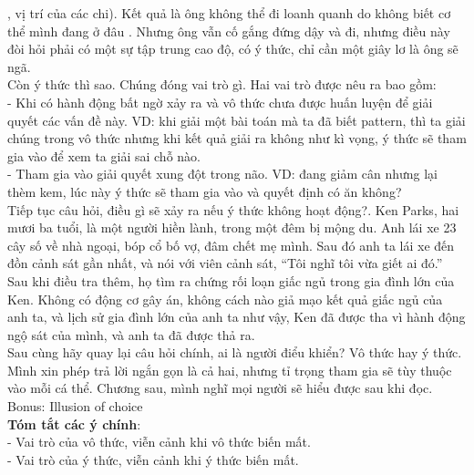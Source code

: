 \documentclass{article}
\newcommand\tab[1][1cm]{\hspace*{#1}}
\begin{document}
, vị trí của các chi). Kết quả là ông không thể đi loanh quanh do không biết cơ thể mình đang ở đâu
. Nhưng ông vẫn cố gắng đứng dậy và đi, nhưng điều này đòi hỏi phải có một sự tập trung cao độ, 
có ý thức, chỉ cần một giây lơ là ông sẽ ngã.\\
\tab Còn ý thức thì sao. Chúng đóng vai trò gì. Hai vai trò được nêu ra bao gồm:\\
\tab - Khi có hành động bất ngờ xảy ra và vô thức chưa được huấn luyện để giải quyết các vấn đề này.
VD: khi giải một bài toán mà ta đã biết pattern, thì ta giải chúng trong vô thức nhưng khi kết quả 
giải ra không như kì vọng, ý thức sẽ tham gia vào để xem ta giải sai chỗ nào.\\
\tab - Tham gia vào giải quyết xung đột trong não. VD: đang giảm cân nhưng lại thèm kem, lúc này ý
thức sẽ tham gia vào và quyết định có ăn không?\\
\tab Tiếp tục câu hỏi, điều gì sẽ xảy ra nếu ý thức không hoạt động?. Ken Parks, hai mươi ba tuổi, 
là một người hiền lành, trong một đêm bị mộng du. Anh lái xe 23 cây số về nhà ngoại, bóp cổ bố vợ,
đâm chết mẹ mình. Sau đó anh ta lái xe đến đồn cảnh sát gần nhất, và nói với viên cảnh sát, “Tôi nghĩ tôi
vừa giết ai đó.” Sau khi điều tra thêm, họ tìm ra chứng rối loạn giấc ngủ trong gia đình lớn của Ken. 
Không có động cơ gây án, không cách nào giả mạo kết quả giấc ngủ của anh ta, và lịch sử gia đình lớn của 
anh ta như vậy, Ken đã được tha vì hành động ngộ sát của mình, và anh ta đã được thả ra.\\
\tab Sau cùng hãy quay lại câu hỏi chính, ai là người điểu khiển? Vô thức hay ý thức. Mình xin phép trả lời
ngắn gọn là cả hai, nhưng tỉ trọng tham gia sẽ tùy thuộc vào mỗi cá thể. Chương sau, mình nghĩ mọi người sẽ 
hiểu được sau khi đọc.\\
\tab Bonus: Illusion of choice\\
\tab \textbf{Tóm tắt các ý chính}: \\
\tab - Vai trò của vô thức, viễn cảnh khi vô thức biến mất.\\
\tab - Vai trò của ý thức, viễn cảnh khi ý thức biến mất.\\
\end{document}
